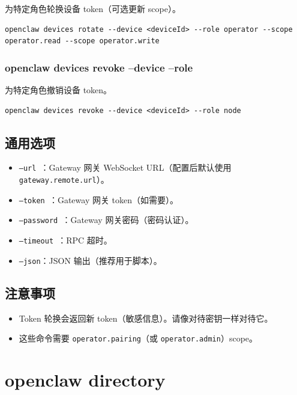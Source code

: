 为特定角色轮换设备 token（可选更新 scope）。

\begin{lstlisting}
openclaw devices rotate --device <deviceId> --role operator --scope operator.read --scope operator.write
\end{lstlisting}


\subsubsection{openclaw devices revoke --device  --role }


为特定角色撤销设备 token。

\begin{lstlisting}
openclaw devices revoke --device <deviceId> --role node
\end{lstlisting}


\subsection{通用选项}


\begin{itemize}
  \item \texttt{--url }：Gateway 网关 WebSocket URL（配置后默认使用 \texttt{gateway.remote.url}）。
  \item \texttt{--token }：Gateway 网关 token（如需要）。
  \item \texttt{--password }：Gateway 网关密码（密码认证）。
  \item \texttt{--timeout }：RPC 超时。
  \item \texttt{--json}：JSON 输出（推荐用于脚本）。
\end{itemize}


\subsection{注意事项}


\begin{itemize}
  \item Token 轮换会返回新 token（敏感信息）。请像对待密钥一样对待它。
  \item 这些命令需要 \texttt{operator.pairing}（或 \texttt{operator.admin}）scope。
\end{itemize}



\clearpage

\section{openclaw directory}


